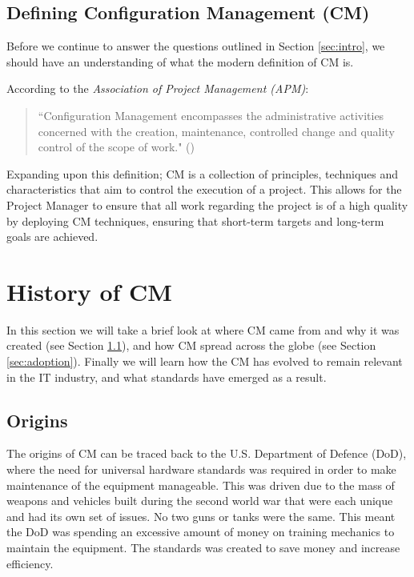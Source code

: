 \documentclass[cmpstyle]{ueacmpstyle}
\begin{document}
		\subsection{Defining Configuration Management (CM)} \label{sec:definition}
		Before we continue to answer the questions outlined in Section \ref{sec:intro}, we should have an understanding of what the modern definition of CM is. 
		
		According to the \emph{Association of Project Management (APM)}: 
		
		\begin{quote}
		``Configuration Management encompasses the administrative activities concerned with the creation, maintenance, controlled change and quality control of the scope of work." (\cite{apmDef})
		\end{quote}
		
		Expanding upon this definition; CM is a collection of principles, techniques and characteristics that aim to control the execution of a project. This allows for the Project Manager to ensure that all work regarding the project is of a high quality by deploying CM techniques, ensuring that short-term targets and long-term goals are achieved.
	
	\section{History of CM} \label{sec:history}
	In this section we will take a brief look at where CM came from and why it was created (see Section \ref{sec:origin}), and how CM spread across the globe (see Section \ref{sec:adoption}). Finally we will learn how the CM has evolved to remain relevant in the IT industry, and what standards have emerged as a result.
	
		\subsection{Origins} \label{sec:origin}
		The origins of CM can be traced back to the U.S. Department of Defence (DoD), where the need for universal hardware standards was required in order to make maintenance of the equipment manageable. This was driven due to the mass of weapons and vehicles built during the second world war that were each unique and had its own set of issues. No two guns or tanks were the same. This meant the DoD was spending an excessive amount of money on training mechanics to maintain the equipment. The standards was created to save money and increase efficiency.
		
\end{document}
